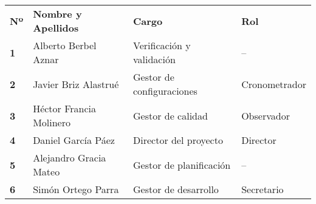 \begin{longtable}{ | C{\tabcolsep} |
                     L{\tabcolsep} |
                     C{\tabcolsep} |
                     C{\tabcolsep} | }
\hline %
 \\
\hline %
{\bf Nº} & {\bf Nombre y Apellidos} & {\bf Cargo} & {\bf Rol} \\
\hline %
{\bf 1} & Alberto Berbel Aznar & Verificación y validación & --  \\
\hline %
{\bf 2} & Javier Briz Alastrué & Gestor de configuraciones & Cronometrador  \\
\hline %
{\bf 3} & Héctor Francia Molinero & Gestor de calidad & Observador  \\
\hline %
{\bf 4} & Daniel García Páez & Director del proyecto & Director \\
\hline %
{\bf 5} & Alejandro Gracia Mateo & Gestor de planificación & --  \\
\hline %
{\bf 6} & Simón Ortego Parra & Gestor de desarrollo & Secretario  \\
\hline %
\end{longtable}

